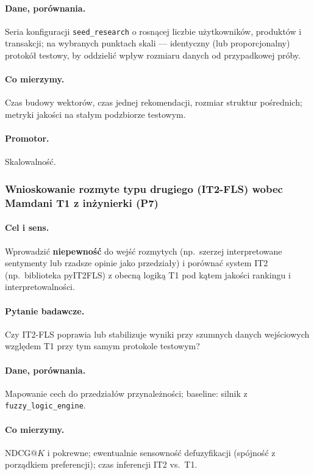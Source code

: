 \documentclass[a4paper,11pt]{article}
\newcommand{\code}[1]{\texttt{\small #1}}
\begin{document}
\paragraph{Dane, porównania.}
Seria konfiguracji \texttt{seed\_research} o rosnącej liczbie użytkowników, produktów i transakcji; na wybranych punktach skali --- identyczny (lub proporcjonalny) protokół testowy, by oddzielić wpływ rozmiaru danych od przypadkowej próby.

\paragraph{Co mierzymy.}
Czas budowy wektorów, czas jednej rekomendacji, rozmiar struktur pośrednich; metryki jakości na stałym podzbiorze testowym.

\paragraph{Promotor.}
Skalowalność.

\subsubsection{Wnioskowanie rozmyte typu drugiego (IT2-FLS) wobec Mamdani T1 z inżynierki (\textbf{P7})}

\paragraph{Cel i sens.}
Wprowadzić \textbf{niepewność} do wejść rozmytych (np.\ szerzej interpretowane sentymenty lub rzadsze opinie jako przedziały) i porównać system IT2 (np.\ biblioteka pyIT2FLS) z obecną logiką T1 pod kątem jakości rankingu i interpretowalności.

\paragraph{Pytanie badawcze.}
Czy IT2-FLS poprawia lub stabilizuje wyniki przy szumnych danych wejściowych względem T1 przy tym samym protokole testowym?

\paragraph{Dane, porównania.}
Mapowanie cech do przedziałów przynależności; baseline: silnik z \code{fuzzy\_logic\_engine}.

\paragraph{Co mierzymy.}
NDCG@$K$ i pokrewne; ewentualnie sensowność defuzyfikacji (spójność z porządkiem preferencji); czas inferencji IT2 vs.\ T1.
\end{document}
